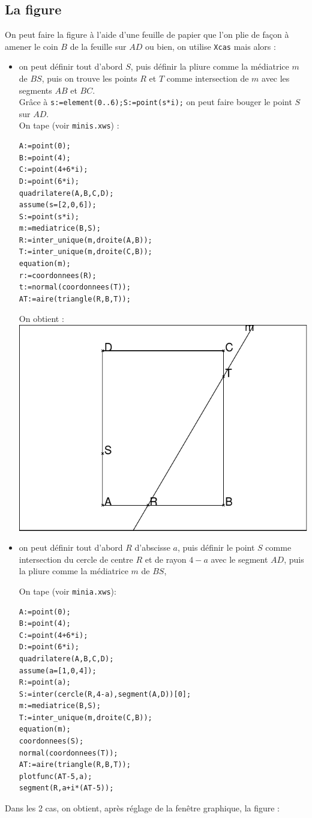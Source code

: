 \documentclass[a4paper,11pt]{book}
\begin{document}
\subsection{La figure}
On peut faire la figure \`a l'aide d'une feuille de papier que l'on plie de 
fa\c{c}on \`a amener le coin $B$ de la feuille sur $AD$ ou bien, on utilise 
{\tt Xcas} mais alors :
\begin{itemize}
\item on peut d\'efinir tout d'abord $S$, puis d\'efinir la 
pliure comme la m\'ediatrice $m$ de $BS$, puis on trouve les points $R$ et $T$
comme intersection de $m$ avec les segments $AB$ et $BC$.\\
Gr\^ace \`a {\tt s:=element(0..6);S:=point(s*i);} on peut faire bouger le point
$S$ sur $AD$.\\
On tape (voir {\tt minis.xws}) :
\begin{verbatim}
A:=point(0);
B:=point(4);
C:=point(4+6*i);
D:=point(6*i);
quadrilatere(A,B,C,D);
assume(s=[2,0,6]);
S:=point(s*i);
m:=mediatrice(B,S);
R:=inter_unique(m,droite(A,B));
T:=inter_unique(m,droite(C,B));
equation(m);
r:=coordonnees(R);
t:=normal(coordonnees(T));
AT:=aire(triangle(R,B,T));
\end{verbatim}
On obtient :\\

\includegraphics[width=\textwidth]{minis}
\item on peut d\'efinir tout d'abord $R$ d'abscisse $a$, puis d\'efinir le 
point $S$ comme intersection du cercle de centre $R$ et de rayon $4-a$ avec le
segment $AD$, puis la pliure comme la m\'ediatrice $m$ de $BS$,
 
On tape  (voir {\tt minia.xws}):
\begin{verbatim}
A:=point(0);
B:=point(4);
C:=point(4+6*i);
D:=point(6*i);
quadrilatere(A,B,C,D);
assume(a=[1,0,4]);
R:=point(a);
S:=inter(cercle(R,4-a),segment(A,D))[0];
m:=mediatrice(B,S);
T:=inter_unique(m,droite(C,B));
equation(m);
coordonnees(S);
normal(coordonnees(T));
AT:=aire(triangle(R,B,T));
plotfunc(AT-5,a);
segment(R,a+i*(AT-5));
\end{verbatim}
\end{itemize}
Dans les 2 cas, on obtient, apr\`es r\'eglage de la fen\^etre graphique, 
la figure :
\end{document}
